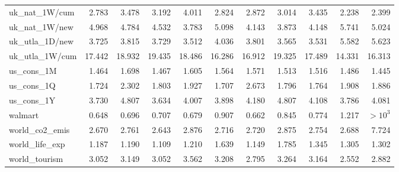 {\begin{longtable}{@{}p{2.2cm}@{\hspace{6pt}}rrrrrrrrrr@{}}
\ttfamily\scriptsize uk\_nat\_1W/cum & \cellcolor{medalBronze}2.783 & 3.478 & 3.192 & 4.011 & 2.824 & 2.872 & 3.014 & 3.435 & \cellcolor{medalGold}2.238 & \cellcolor{medalSilver}2.399 \\
\ttfamily\scriptsize uk\_nat\_1W/new & 4.968 & 4.784 & 4.532 & \cellcolor{medalGold}3.783 & 5.098 & \cellcolor{medalBronze}4.143 & \cellcolor{medalSilver}3.873 & 4.148 & 5.741 & 5.024 \\
\ttfamily\scriptsize uk\_utla\_1D/new & 3.725 & 3.815 & 3.729 & \cellcolor{medalGold}3.512 & 4.036 & 3.801 & \cellcolor{medalBronze}3.565 & \cellcolor{medalSilver}3.531 & 5.582 & 5.623 \\
\ttfamily\scriptsize uk\_utla\_1W/cum & 17.442 & 18.932 & 19.435 & 18.486 & \cellcolor{medalSilver}16.286 & 16.912 & 19.325 & 17.489 & \cellcolor{medalGold}14.331 & \cellcolor{medalBronze}16.313 \\
\ttfamily\scriptsize us\_cons\_1M & \cellcolor{medalSilver}1.464 & 1.698 & \cellcolor{medalBronze}1.467 & 1.605 & 1.564 & 1.571 & 1.513 & 1.516 & 1.486 & \cellcolor{medalGold}1.445 \\
\ttfamily\scriptsize us\_cons\_1Q & \cellcolor{medalSilver}1.724 & 2.302 & 1.803 & 1.927 & \cellcolor{medalGold}1.707 & 2.673 & 1.796 & \cellcolor{medalBronze}1.764 & 1.908 & 1.886 \\
\ttfamily\scriptsize us\_cons\_1Y & \cellcolor{medalSilver}3.730 & 4.807 & \cellcolor{medalGold}3.634 & 4.007 & 3.898 & 4.180 & 4.807 & 4.108 & \cellcolor{medalBronze}3.786 & 4.081 \\
\ttfamily\scriptsize walmart & \cellcolor{medalGold}0.648 & 0.696 & 0.707 & \cellcolor{medalBronze}0.679 & 0.907 & \cellcolor{medalSilver}0.662 & 0.845 & 0.774 & 1.217 & $>\!10^{3}$ \\
\ttfamily\scriptsize world\_co2\_emis & \cellcolor{medalSilver}2.670 & 2.761 & \cellcolor{medalGold}2.643 & 2.876 & 2.716 & 2.720 & 2.875 & 2.754 & \cellcolor{medalBronze}2.688 & 7.724 \\
\ttfamily\scriptsize world\_life\_exp & \cellcolor{medalBronze}1.187 & 1.190 & \cellcolor{medalGold}1.109 & 1.210 & 1.639 & \cellcolor{medalSilver}1.149 & 1.785 & 1.345 & 1.305 & 1.302 \\
\ttfamily\scriptsize world\_tourism & 3.052 & 3.149 & 3.052 & 3.562 & 3.208 & \cellcolor{medalSilver}2.795 & 3.264 & 3.164 & \cellcolor{medalGold}2.552 & \cellcolor{medalBronze}2.882 \\
\end{longtable}
}

